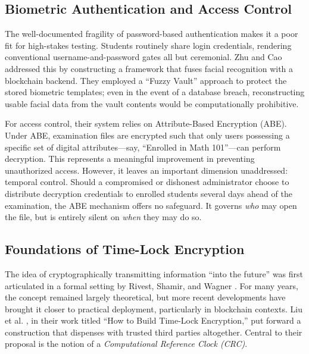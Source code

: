 \documentclass[final,5p,times]{elsarticle}
\begin{document}
\subsection{Biometric Authentication and Access Control}
The well-documented fragility of password-based authentication makes it a poor fit for high-stakes testing. Students routinely share login credentials, rendering conventional username-and-password gates all but ceremonial. Zhu and Cao \cite{zhu2021secure} addressed this by constructing a framework that fuses facial recognition with a blockchain backend. They employed a ``Fuzzy Vault'' approach to protect the stored biometric templates; even in the event of a database breach, reconstructing usable facial data from the vault contents would be computationally prohibitive.

For access control, their system relies on Attribute-Based Encryption (ABE). Under ABE, examination files are encrypted such that only users possessing a specific set of digital attributes—say, ``Enrolled in Math 101''—can perform decryption. This represents a meaningful improvement in preventing unauthorized access. However, it leaves an important dimension unaddressed: temporal control. Should a compromised or dishonest administrator choose to distribute decryption credentials to enrolled students several days ahead of the examination, the ABE mechanism offers no safeguard. It governs \textit{who} may open the file, but is entirely silent on \textit{when} they may do so.

\subsection{Foundations of Time-Lock Encryption}
The idea of cryptographically transmitting information ``into the future'' was first articulated in a formal setting by Rivest, Shamir, and Wagner \cite{rivest1996time}. For many years, the concept remained largely theoretical, but more recent developments have brought it closer to practical deployment, particularly in blockchain contexts. Liu et al. \cite{liu2018build}, in their work titled ``How to Build Time-Lock Encryption,'' put forward a construction that dispenses with trusted third parties altogether. Central to their proposal is the notion of a \textit{Computational Reference Clock (CRC)}.
\end{document}
